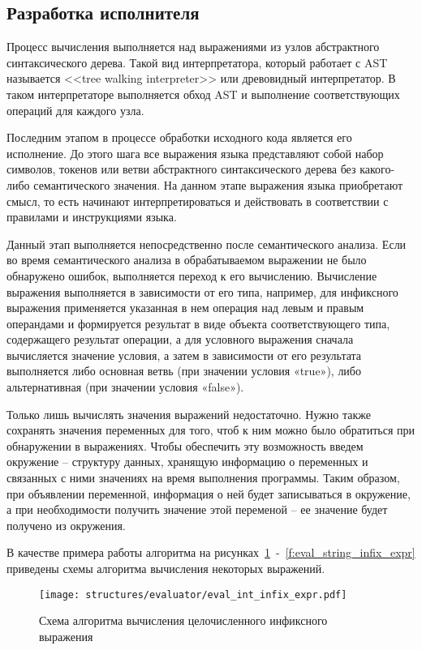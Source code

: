 \subsection{Разработка исполнителя}

Процесс вычисления выполняется над выражениями из узлов абстрактного синтаксического дерева.
Такой вид интерпретатора, который работает с AST называется <<tree walking interpreter>> или древовидный интерпретатор.
В таком интерпретаторе выполняется обход AST и выполнение соответствующих операций для каждого узла.

Последним этапом в процессе обработки исходного кода является его исполнение.
До этого шага все выражения языка представляют собой набор символов, токенов или ветви абстрактного синтаксического дерева без какого-либо семантического значения.
На данном этапе выражения языка приобретают смысл, то есть начинают интерпретироваться и действовать в соответствии с правилами и инструкциями языка.

Данный этап выполняется непосредственно после семантического анализа.
Если во время семантического анализа в обрабатываемом выражении не было обнаружено ошибок, выполняется переход к его вычислению.
Вычисление выражения выполняется в зависимости от его типа, например,
для инфиксного выражения применяется указанная в нем операция над левым и правым операндами и формируется результат в виде объекта соответствующего типа,
содержащего результат операции, а для условного выражения сначала вычисляется значение условия,
а затем в зависимости от его результата выполняется либо основная ветвь (при значении условия «true»), либо альтернативная (при значении условия «false»).

Только лишь вычислять значения выражений недостаточно.
Нужно также сохранять значения переменных для того, чтоб к ним можно было обратиться при обнаружении в выражениях.
Чтобы обеспечить эту возможность введем окружение – структуру данных, хранящую информацию о переменных и связанных с ними значениях на время выполнения программы.
Таким образом, при объявлении переменной, информация о ней будет записываться в окружение, а при необходимости получить значение этой переменой – ее значение будет получено из окружения.

В качестве примера работы алгоритма на рисунках~\ref{f:eval_int_infix_expr}~-~\ref{f:eval_string_infix_expr} приведены схемы алгоритма вычисления некоторых выражений.

\clearpage

\begin{figure}[!htp]
	\centering
	\texttt{[image: structures/evaluator/eval\_int\_infix\_expr.pdf]}
	\caption{Схема алгоритма вычисления целочисленного инфиксного выражения}
	\label{f:eval_int_infix_expr}
\end{figure}

